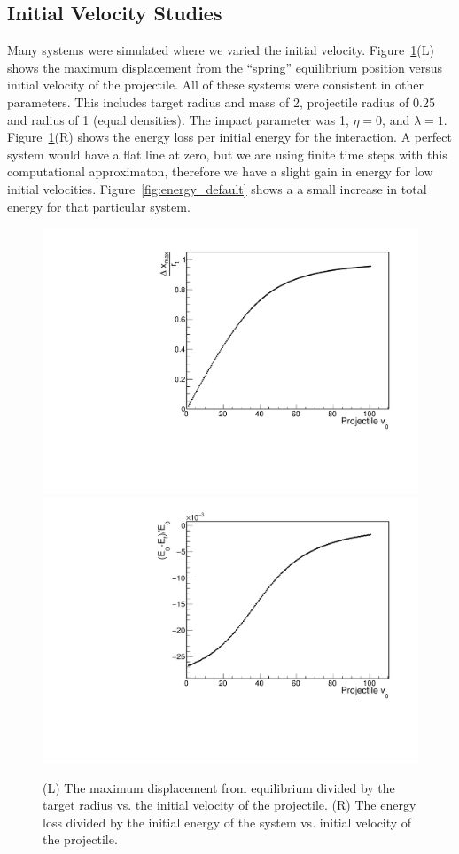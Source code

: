 \documentclass[aps,prl,floatfix,preprint,nofootinbib]{revtex4}
\begin{document}
\subsection{Initial Velocity Studies}
Many systems were simulated where we varied the initial velocity. Figure~\ref{fig:changing_pvinit1}(L) shows the maximum displacement from the ``spring'' equilibrium position versus initial velocity of the projectile. All of these systems were consistent in other parameters. This includes target radius and mass of 2, projectile radius of 0.25 and radius of 1 (equal densities). The impact parameter was 1, $\eta = 0$, and $\lambda = 1$. Figure~\ref{fig:changing_pvinit1}(R) shows the energy loss per initial energy for the interaction. A perfect system would have a flat line at zero, but we are using finite time steps with this computational approximaton, therefore we have a slight gain in energy for low initial velocities. Figure~\ref{fig:energy_default} shows a a small increase in total energy for that particular system.
\begin{figure}[h!]
  \includegraphics[width=.45\linewidth]{plots/trend_plots/dxmax_vs_pvinit.pdf}
  \includegraphics[width=.45\linewidth]{plots/trend_plots/Eloss_vs_pvinit.pdf}
  \caption{(L) The maximum displacement from equilibrium divided by the target radius vs. the initial velocity of the projectile. (R) The energy loss divided by the initial energy of the system vs. initial velocity of the projectile.}
  \label{fig:changing_pvinit1}
\end{figure}
\end{document}
